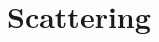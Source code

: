 \documentclass[\main/dresen_thesis.tex]{subfiles}
\begin{document}
\section{Scattering}\label{ch:theoreticalBackground:scattering}
\end{document}
